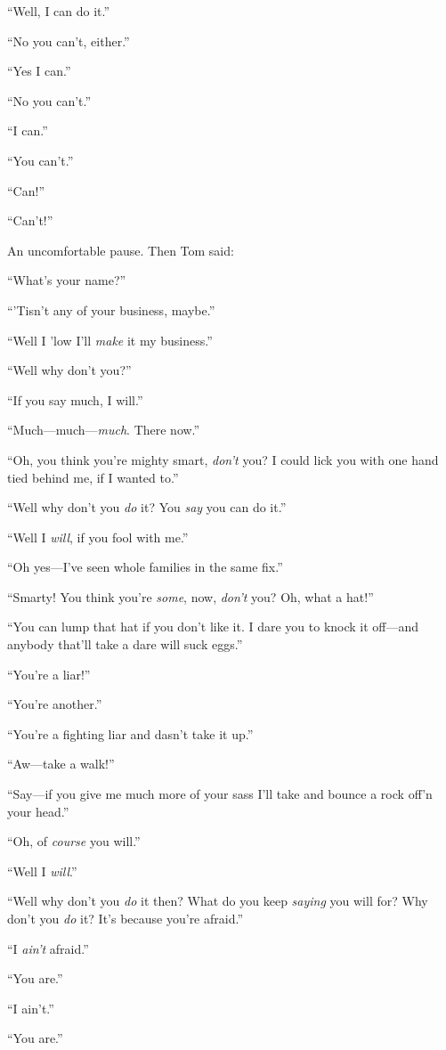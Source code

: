 \documentclass{book}
\begin{document}
“Well, I can do it.”

“No you can’t, either.”

“Yes I can.”

“No you can’t.”

“I can.”

“You can’t.”

“Can!”

“Can’t!”

An uncomfortable pause. Then Tom said:

“What’s your name?”

“’Tisn’t any of your business, maybe.”

“Well I ’low I’ll \emph{make} it my business.”

“Well why don’t you?”

“If you say much, I will.”

“Much—much—\emph{much}. There now.”

“Oh, you think you’re mighty smart, \emph{don’t} you? I could lick you with one hand tied behind me, if I wanted to.”

“Well why don’t you \emph{do} it? You \emph{say} you can do it.”

“Well I \emph{will}, if you fool with me.”

“Oh yes—I’ve seen whole families in the same fix.”

“Smarty! You think you’re \emph{some}, now, \emph{don’t} you? Oh, what a hat!”

“You can lump that hat if you don’t like it. I dare you to knock it off—and anybody that’ll take a dare will suck eggs.”

“You’re a liar!”

“You’re another.”

“You’re a fighting liar and dasn’t take it up.”

“Aw—take a walk!”

“Say—if you give me much more of your sass I’ll take and bounce a rock off’n your head.”

“Oh, of \emph{course} you will.”

“Well I \emph{will}.”

“Well why don’t you \emph{do} it then? What do you keep \emph{saying} you will for? Why don’t you \emph{do} it? It’s because you’re afraid.”

“I \emph{ain’t} afraid.”

“You are.”

“I ain’t.”

“You are.”
\end{document}
